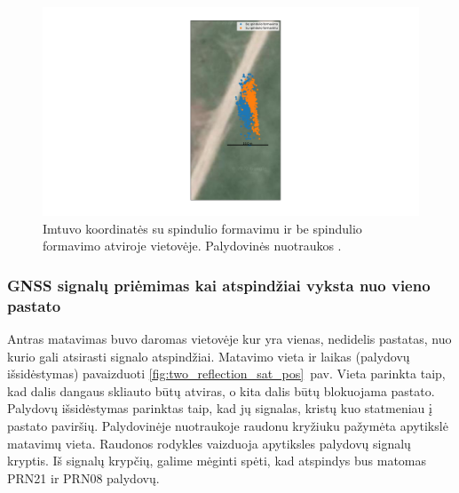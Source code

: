 \documentclass[main.tex]{subfiles}
\begin{document}
\begin{figure}[ht]
    \begin{centering}
    \hspace*{-3cm}\includegraphics[scale=0.45]{drawings/no_reflection_map}
    \par\end{centering}
    \protect\caption{\label{fig:no_reflection_map}Imtuvo koordinatės su spindulio formavimu ir be spindulio formavimo atviroje vietovėje. Palydovinės nuotraukos \cite{google_maps}.}
\end{figure}



\subsubsection{GNSS signalų priėmimas kai atspindžiai vyksta nuo vieno pastato}\label{sec:gnss_meas_one_reflection}

Antras matavimas buvo daromas vietovėje kur yra vienas, nedidelis pastatas, nuo kurio gali atsirasti
signalo atspindžiai. Matavimo vieta ir laikas (palydovų išsidėstymas) pavaizduoti \ref{fig:two_reflection_sat_pos}~pav.
Vieta parinkta taip, kad dalis dangaus skliauto būtų atviras, o kita dalis būtų blokuojama pastato.
Palydovų išsidėstymas parinktas taip, kad jų signalas, kristų kuo statmeniau į pastato paviršių.
Palydovinėje nuotraukoje raudonu kryžiuku pažymėta apytikslė matavimų vieta. Raudonos rodykles
vaizduoja apytiksles palydovų signalų kryptis. Iš signalų krypčių, galime mėginti spėti,
kad atspindys bus matomas PRN21 ir PRN08 palydovų.
\end{document}
